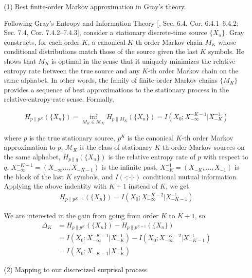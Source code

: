 \documentclass{article}
\theoremstyle{plain}
\theoremstyle{definition}
\theoremstyle{remark}
\begin{document}
(1) Best finite-order Markov approximation in Gray's theory. 

Following Gray's Entropy and Information Theory [\cite{gray2011entropy}, Sec. 6.4, Cor. 6.4.1–6.4.2; Sec. 7.4, Cor. 7.4.2–7.4.3], consider a stationary discrete-time source $\{X_n\}$. Gray constructs, for each order $K$, a canonical $K$-th order Markov chain $M_K$ whose conditional distributions match those of the source given the last $K$ symbols. He shows that $M_K$ is optimal in the sense that it uniquely minimizes the relative entropy rate between the true source and any $K$-th order Markov chain on the same alphabet. In other words, the family of finite-order Markov chains $\{M_K\}$ provides a sequence of best approximations to the stationary process in the relative-entropy-rate sense. Formally,

\begin{align}
H_{p\|p^K} (\{X_n\}) = \inf_{M_K\in \mathcal{M}_K} H_{p\|M_K}(\{X_n\}) = I(X_0;X_{-\infty}^{-K-1}|X_{-K}^{-1})
\end{align}

where $p$ is the true stationary source, $p^K$ is the canonical $K$-th order Markov approximation to $p$, $\mathcal{M}_K$ is the class of stationary $K$-th order Markov sources on the same alphabet, $H_{p\|q} (\{X_n\})$ is the relative entropy rate of $p$ with respect to $q$, $X_{-\infty}^{-K-1}=(X_{-\infty}\dots,X_{-K-1})$ is the infinite past, $X_{-K}^{-1}=(X_{-K},\dots,X_{-1})$ is the block of the last $K$ symbols, and $I(\cdot;\cdot|\cdot)$ conditional mutual information. Applying the above indentity with $K+1$ instead of $K$, we get
\begin{align}
H_{p\|p^{K+1}}(\{X_n\}) = I(X_0;X_{-\infty}^{-K-2}|X_{-K-1}^{-1})
\end{align}

We are interested in the gain from going from order $K$ to $K+1$, so
\begin{align}
\Delta_K&= H_{p\|p^K} (\{X_n\})-H_{p\|p^{K+1}}(\{X_n\}) \\
& = I(X_0;X_{-\infty}^{-K-1}|X_{-K}^{-1}) - I(X_0;X_{-\infty}^{-K-2}|X_{-K-1}^{-1}) \\
& = I(X_0;X_{-K-1}|X_{-K}^{-1})
\end{align}

(2) Mapping to our discretized surprisal process
\end{document}
